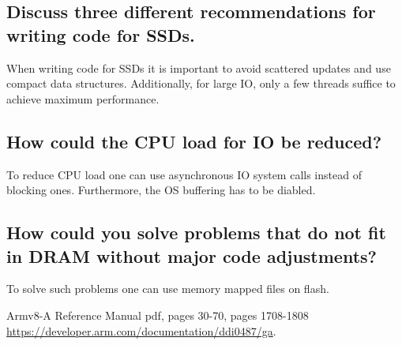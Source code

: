 \documentclass[runningheads]{llncs}
\begin{document}
\subsection{Discuss three different recommendations for writing code for SSDs.}
When writing code for SSDs it is important to avoid scattered updates and use compact data structures.
Additionally, for large IO, only a few threads suffice to achieve maximum performance.

\subsection{How could the CPU load for IO be reduced?}
To reduce CPU load one can use asynchronous IO system calls instead of blocking ones.
Furthermore, the OS buffering has to be diabled.

\subsection{How could you solve problems that do not fit in DRAM without major code adjustments?}
To solve such problems one can use memory mapped files on flash.

%
%
%
% 
% 
%
\begin{thebibliography}{8}

Armv8-A Reference Manual pdf, pages 30-70, pages 1708-1808 \\ \url{https://developer.arm.com/documentation/ddi0487/ga}.

\end{thebibliography}
\end{document}
